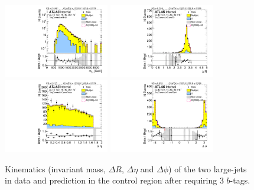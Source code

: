 \begin{figure}[htb!]
\begin{center}
\includegraphics[width=0.41\textwidth,angle=-90]{figures/boosted/Control/b77_ThreeTag_Control_mHH_l_1.pdf}
\includegraphics[width=0.41\textwidth,angle=-90]{figures/boosted/Control/b77_ThreeTag_Control_hCandDr.pdf}\\
\includegraphics[width=0.41\textwidth,angle=-90]{figures/boosted/Control/b77_ThreeTag_Control_hCandDeta.pdf}
\includegraphics[width=0.41\textwidth,angle=-90]{figures/boosted/Control/b77_ThreeTag_Control_hCandDphi.pdf}
  \caption{Kinematics (invariant mass, $\Delta R$, $\Delta \eta$ and $\Delta \phi$) of the two large-\R jets in data and prediction in the control region after requiring 3 $b$-tags.  }
  \label{fig:boosted-3b-control-ak10-system}
\end{center}
\end{figure}

